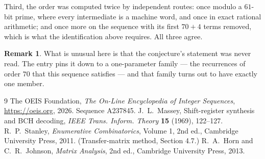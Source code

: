\documentclass[11pt,a4paper]{article}
\theoremstyle{plain}
\theoremstyle{definition}
\newtheorem{remark}[theorem]{Remark}
\begin{document}
Third, the order was computed twice by independent routes: once modulo a $61$-bit prime, where
every intermediate is a machine word, and once in exact rational arithmetic; and once more on
the sequence with its first $70+4$ terms removed, which is what the identification above
requires. All three agree.

\begin{remark}
What is unusual here is that the conjecture's statement was never read. The entry pins it down
to a one-parameter family --- the recurrences of order $70$ that this sequence satisfies
--- and that family turns out to have exactly one member.
\end{remark}

\begin{thebibliography}{9}
 The OEIS Foundation, \emph{The On-Line Encyclopedia of Integer
Sequences}, \url{https://oeis.org}, 2026. Sequence A237845.
 J.~L.~Massey, Shift-register synthesis and BCH decoding, \emph{IEEE
Trans. Inform. Theory} \textbf{15} (1969), 122--127.
 R.~P.~Stanley, \emph{Enumerative Combinatorics}, Volume 1, 2nd ed.,
Cambridge University Press, 2011. (Transfer-matrix method, Section 4.7.)
 R.~A.~Horn and C.~R.~Johnson, \emph{Matrix Analysis}, 2nd ed., Cambridge
University Press, 2013.
\end{thebibliography}
\end{document}
